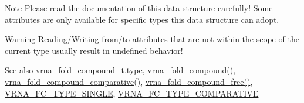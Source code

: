 \begin{DoxyNote}{Note}
Please read the documentation of this data structure carefully! Some attributes are only available for specific types this data structure can adopt.
\end{DoxyNote}
\begin{DoxyWarning}{Warning}
Reading/\+Writing from/to attributes that are not within the scope of the current type usually result in undefined behavior!
\end{DoxyWarning}
\begin{DoxySeeAlso}{See also}
\hyperlink{group__fold__compound_ac5eab693deac9a1a40c2a95ac294707c}{vrna\+\_\+fold\+\_\+compound\+\_\+t.\+type}, \hyperlink{group__fold__compound_ga6601d994ba32b11511b36f68b08403be}{vrna\+\_\+fold\+\_\+compound()}, \hyperlink{group__fold__compound_gad6bacc816af274922b13d947f708aa0c}{vrna\+\_\+fold\+\_\+compound\+\_\+comparative()}, \hyperlink{group__fold__compound_gadded6039d63f5d6509836e20321534ad}{vrna\+\_\+fold\+\_\+compound\+\_\+free()}, \hyperlink{group__fold__compound_gga01a4ff86fa71deaaa5d1abbd95a1447da7e264dd3cf2dc9b6448caabcb7763cd6}{V\+R\+N\+A\+\_\+\+F\+C\+\_\+\+T\+Y\+P\+E\+\_\+\+S\+I\+N\+G\+LE}, \hyperlink{group__fold__compound_gga01a4ff86fa71deaaa5d1abbd95a1447dab821ce46ea3cf665be97df22a76f5023}{V\+R\+N\+A\+\_\+\+F\+C\+\_\+\+T\+Y\+P\+E\+\_\+\+C\+O\+M\+P\+A\+R\+A\+T\+I\+VE}
\end{DoxySeeAlso}
